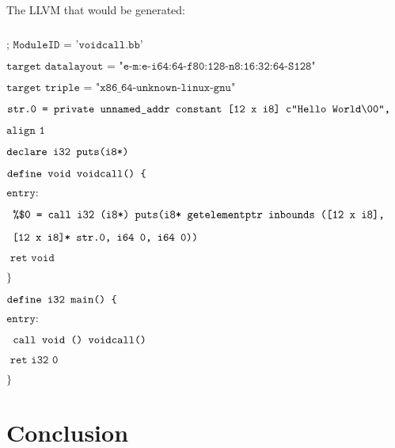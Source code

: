 \documentclass[journal=jacsat, manuscript=article]{achemso}
\begin{document}
The LLVM that would be generated:

$\texttt{}$


$\texttt{; ModuleID = 'voidcall.bb'}$

$\texttt{target datalayout = "e-m:e-i64:64-f80:128-n8:16:32:64-S128"}$

$\texttt{target triple = "x86\_64-unknown-linux-gnu"}$

$\texttt{\@str.0 = private unnamed\_addr constant [12 x i8] c"Hello World\textbackslash00",}$


$\texttt{align 1}$

$\texttt{declare i32 \@puts(i8*)}$

$\texttt{define void \@voidcall() \{}$

$\texttt{entry:}$

$\texttt{  \%\$0 = call i32 (i8*) \@puts(i8* getelementptr inbounds ([12 x i8], }$

$\texttt{  [12 x i8]* \@str.0, i64 0, i64 0)) }$

$\texttt{  ret void}$

$\texttt{\}}$

$\texttt{define i32 \@main() \{}$

$\texttt{entry:}$

$\texttt{  call void () \@voidcall()}$

$\texttt{  ret i32 0}$

$\texttt{\}}$

\section{Conclusion}
\end{document}
